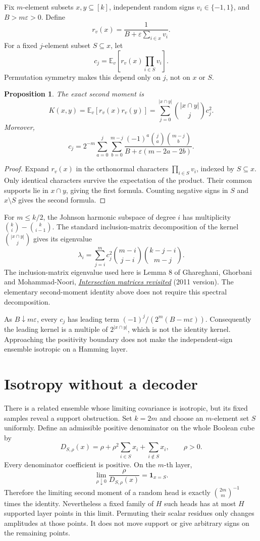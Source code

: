 \documentclass[11pt]{article}
\newtheorem{proposition}{Proposition}
\begin{document}
Fix $m$-element subsets $x,y\subseteq[k]$, independent random signs
$v_i\in\{-1,1\}$, and $B>m\varepsilon>0$. Define
\[
 r_v(x)=\frac1{B+\varepsilon\sum_{i\in x}v_i}.
\]
For a fixed $j$-element subset $S\subseteq x$, let
\[
 c_j=\mathbb E_v\left[r_v(x)\prod_{i\in S}v_i\right].
\]
Permutation symmetry makes this depend only on $j$, not on $x$ or $S$.

\begin{proposition}
The exact second moment is
\[
 K(x,y)=\mathbb E_v[r_v(x)r_v(y)]
       =\sum_{j=0}^{|x\cap y|}\binom{|x\cap y|}{j}c_j^2.
\]
Moreover,
\[
 c_j=2^{-m}\sum_{a=0}^j\sum_{b=0}^{m-j}
    \frac{(-1)^a\binom ja\binom{m-j}b}
         {B+\varepsilon(m-2a-2b)}.
\]
\end{proposition}
\begin{proof}
Expand $r_v(x)$ in the orthonormal characters
$\prod_{i\in S}v_i$, indexed by $S\subseteq x$. Only identical characters
survive the expectation of the product. Their common supports lie in
$x\cap y$, giving the first formula. Counting negative signs in $S$ and
$x\setminus S$ gives the second formula.
\end{proof}

For $m\leq k/2$, the Johnson harmonic subspace of degree $i$ has multiplicity
$\binom ki-\binom k{i-1}$. The standard inclusion-matrix decomposition
of the kernel $\binom{|x\cap y|}{j}$ gives its eigenvalue
\[
 \lambda_i=\sum_{j=i}^m c_j^2
       \binom{m-i}{j-i}\binom{k-j-i}{m-j}.
\]
The inclusion-matrix eigenvalue used here is Lemma 8 of Ghareghani,
Ghorbani and Mohammad-Noori,
\href{https://arxiv.org/abs/0902.4367}{\emph{Intersection matrices revisited}}
(2011 version). The elementary second-moment identity above does not
require this spectral decomposition.

As $B\downarrow m\varepsilon$, every $c_j$ has leading term
$(-1)^j/(2^m(B-m\varepsilon))$. Consequently the leading kernel is a
multiple of $2^{|x\cap y|}$, which is not the identity kernel. Approaching
the positivity boundary does not make the independent-sign ensemble
isotropic on a Hamming layer.

\section{Isotropy without a decoder}

There is a related ensemble whose limiting covariance is isotropic, but
its fixed samples reveal a support obstruction. Set $k=2m$ and choose an
$m$-element set $S$ uniformly. Define an admissible positive denominator
on the whole Boolean cube by
\[
 D_{S,\rho}(x)=\rho+\rho^2\sum_{i\in S}x_i
                         +\sum_{i\notin S}x_i,
 \qquad \rho>0.
\]
Every denominator coefficient is positive. On the $m$-th layer,
\[
 \lim_{\rho\downarrow0}\frac{\rho}{D_{S,\rho}(x)}
 =\mathbf1_{x=S}.
\]
Therefore the limiting second moment of a random head is exactly
$\binom{2m}m^{-1}$ times the identity. Nevertheless a fixed family of
$H$ such heads has at most $H$ supported layer points in this limit.
Permuting their scalar residues only changes amplitudes at those points.
It does not move support or give arbitrary signs on the remaining points.
\end{document}
